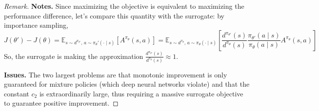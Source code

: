 \documentclass[11pt, letterpaper]{article}
\newenvironment{remark}
    {\renewcommand\qedsymbol{\(\blacksquare\)}\begin{proof}[Remark]}
    {\end{proof}}
\begin{document}
\begin{remark}
    \textbf{Notes.} Since maximizing the objective is equivalent to maximizing the performance difference, let's compare this quantity with the surrogate: by importance sampling, 
    \[
        J(\theta') - J(\theta)
        = \mathbb{E}_{s \sim d^{\pi_{\theta'}},\, a \sim \pi_\theta'(\cdot \mid s)} \left[ A^{\pi_\theta}(s, a) \right]
        = \mathbb{E}_{s \sim d^{\pi_\theta},\, a \sim \pi_\theta(\cdot \mid s)} \left[ \frac{d^{\pi_{\theta'}}(s)}{d^{\pi_\theta}(s)} \frac{\pi_{\theta'}(a \mid s)}{\pi_\theta(a \mid s)} A^{\pi_\theta}(s, a) \right]
    \]
    So, the surrogate is making the approximation \(\frac{d^{\pi_{\theta'}}(s)}{d^{\pi_\theta}(s)} \approx 1\). 

    \textbf{Issues.} The two largest problems are that monotonic improvement is only guaranteed for mixture policies (which deep neural networks violate) and that the constant \(c_2\) is extraordinarily large, thus requiring a massive surrogate objective to guarantee positive improvement. 
\end{remark}
\end{document}

